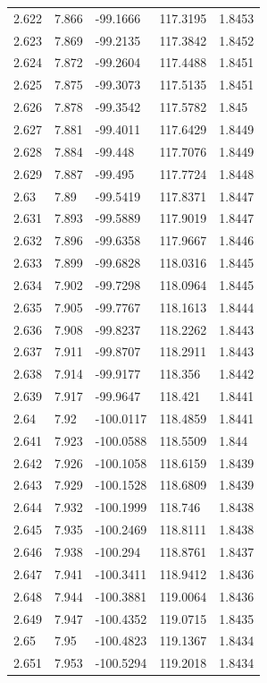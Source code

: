 \begin{tabular}{lllll}
2.622 & 7.866 & -99.1666 & 117.3195 & 1.8453 \\
2.623 & 7.869 & -99.2135 & 117.3842 & 1.8452 \\
2.624 & 7.872 & -99.2604 & 117.4488 & 1.8451 \\
2.625 & 7.875 & -99.3073 & 117.5135 & 1.8451 \\
2.626 & 7.878 & -99.3542 & 117.5782 & 1.845 \\
2.627 & 7.881 & -99.4011 & 117.6429 & 1.8449 \\
2.628 & 7.884 & -99.448 & 117.7076 & 1.8449 \\
2.629 & 7.887 & -99.495 & 117.7724 & 1.8448 \\
2.63 & 7.89 & -99.5419 & 117.8371 & 1.8447 \\
2.631 & 7.893 & -99.5889 & 117.9019 & 1.8447 \\
2.632 & 7.896 & -99.6358 & 117.9667 & 1.8446 \\
2.633 & 7.899 & -99.6828 & 118.0316 & 1.8445 \\
2.634 & 7.902 & -99.7298 & 118.0964 & 1.8445 \\
2.635 & 7.905 & -99.7767 & 118.1613 & 1.8444 \\
2.636 & 7.908 & -99.8237 & 118.2262 & 1.8443 \\
2.637 & 7.911 & -99.8707 & 118.2911 & 1.8443 \\
2.638 & 7.914 & -99.9177 & 118.356 & 1.8442 \\
2.639 & 7.917 & -99.9647 & 118.421 & 1.8441 \\
2.64 & 7.92 & -100.0117 & 118.4859 & 1.8441 \\
2.641 & 7.923 & -100.0588 & 118.5509 & 1.844 \\
2.642 & 7.926 & -100.1058 & 118.6159 & 1.8439 \\
2.643 & 7.929 & -100.1528 & 118.6809 & 1.8439 \\
2.644 & 7.932 & -100.1999 & 118.746 & 1.8438 \\
2.645 & 7.935 & -100.2469 & 118.8111 & 1.8438 \\
2.646 & 7.938 & -100.294 & 118.8761 & 1.8437 \\
2.647 & 7.941 & -100.3411 & 118.9412 & 1.8436 \\
2.648 & 7.944 & -100.3881 & 119.0064 & 1.8436 \\
2.649 & 7.947 & -100.4352 & 119.0715 & 1.8435 \\
2.65 & 7.95 & -100.4823 & 119.1367 & 1.8434 \\
2.651 & 7.953 & -100.5294 & 119.2018 & 1.8434 \\

\end{tabular}
